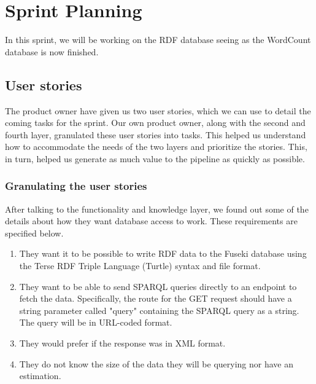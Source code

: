 \section{Sprint Planning}\label{section:sprintPlanningSprint5}
In this sprint, we will be working on the RDF database seeing as the WordCount database is now finished.

\subsection*{User stories}\label{sec:userstories5}
The \knox{} product owner have given us two user stories, which we can use to detail the coming tasks for the sprint.
Our own product owner, along with the second and fourth layer, granulated these user stories into tasks.
This helped us understand how to accommodate the needs of the two layers and prioritize the stories.
This, in turn, helped us generate as much value to the pipeline as quickly as possible\cite{UserStories}.


\subsubsection*{Granulating the user stories}
After talking to the functionality and knowledge layer, we found out some of the details about how they want database access to work. These requirements are specified below.



\begin{enumerate}
    \item They want it to be possible to write RDF data to the Fuseki database using the Terse RDF Triple Language (Turtle) syntax and file format\cite{TurtleFormat}.
    \item They want to be able to send SPARQL queries directly to an endpoint to fetch the data. Specifically, the route for the GET request should have a string parameter called "query" containing the SPARQL query as a string. The query will be in URL-coded format.
    \item They would prefer if the response was in XML format.
    \item They do not know the size of the data they will be querying nor have an estimation.
\end{enumerate}

